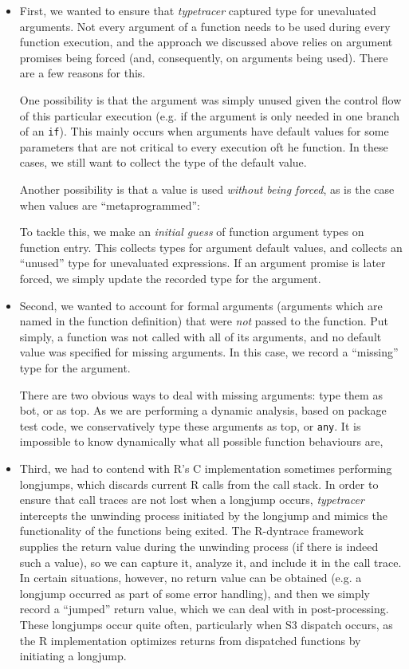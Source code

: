 \documentclass[acmsmall,review,anonymous]{acmart}\settopmatter{printfolios=true,printccs=false,printacmref=false}
\newcommand{\code}[1]{{\lstinline[style=Rin]!#1!}\xspace}
\newcommand{\typetracer}{\emph{typetracer}\xspace} %
\begin{document}
\begin{itemize}

\item First, we wanted to ensure that \typetracer captured type for unevaluated arguments. 
Not every argument of a function needs to be used during every function execution, and the approach we discussed above relies on argument promises being forced (and, consequently, on arguments being used).
There are a few reasons for this.

One possibility is that the argument was simply unused given the control flow of this particular execution (e.g. if the argument is only needed in one branch of an \code{if}).
This mainly occurs when arguments have default values for some parameters that are not critical to every execution oft he function.
In these cases, we still want to collect the type of the default value.

Another possibility is that a value is used {\it without being forced}, as is the case when values are ``metaprogrammed'': 

To tackle this, we make an {\it initial guess} of function argument types on function entry.
This collects types for argument default values, and collects an ``unused'' type for unevaluated expressions.
If an argument promise is later forced, we simply update the recorded type for the argument.

\item Second, we wanted to account for formal arguments (arguments which are named in the function definition) that were {\it not} passed to the function.
Put simply, a function was not called with all of its arguments, and no default value was specified for missing arguments.
In this case, we record a ``missing'' type for the argument.

There are two obvious ways to deal with missing arguments: type them as bot, or as top.
As we are performing a dynamic analysis, based on package test code, we conservatively type these arguments as top, or \code{any}.
It is impossible to know dynamically what all possible function behaviours are, 

\item Third, we had to contend with R's C implementation sometimes performing longjumps, which discards current R calls from the call stack.
In order to ensure that call traces are not lost when a longjump occurs, \typetracer intercepts the unwinding process initiated by the longjump and mimics the functionality of the functions being exited.
The R-dyntrace framework supplies the return value during the unwinding process (if there is indeed such a value), so we can capture it, analyze it, and include it in the call trace.
In certain situations, however, no return value can be obtained (e.g. a longjump occurred as part of some error handling), and then we simply record a ``jumped'' return value, which we can deal with in post-processing.
These longjumps occur quite often, particularly when S3 dispatch occurs, as the R implementation optimizes returns from dispatched functions by initiating a longjump.

\end{itemize}
\end{document}
